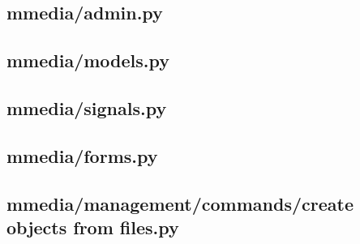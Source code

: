 \subsection{mmedia/admin.py}


\subsection{mmedia/models.py}


\subsection{mmedia/signals.py}


\subsection{mmedia/forms.py}


\subsection{mmedia/management/commands/create objects from files.py}

